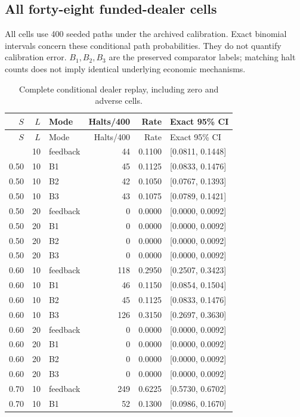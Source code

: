\subsection{All forty-eight funded-dealer cells}
All cells use 400 seeded paths under the archived calibration. Exact binomial intervals concern these conditional path probabilities. They do not quantify calibration error. $B_1,B_2,B_3$ are the preserved comparator labels; matching halt counts does not imply identical underlying economic mechanisms.
\begin{longtable}{rrlrrl}
\caption{Complete conditional dealer replay, including zero and adverse cells.}\\
\toprule $S$ & $L$ & Mode & Halts/400 & Rate & Exact 95\% CI\\\midrule\endfirsthead
\toprule $S$ & $L$ & Mode & Halts/400 & Rate & Exact 95\% CI\\\midrule\endhead
\bottomrule\endfoot
0.50 & 10 & feedback & 44 & 0.1100 & [0.0811, 0.1448]\\
0.50 & 10 & B1 & 45 & 0.1125 & [0.0833, 0.1476]\\
0.50 & 10 & B2 & 42 & 0.1050 & [0.0767, 0.1393]\\
0.50 & 10 & B3 & 43 & 0.1075 & [0.0789, 0.1421]\\
0.50 & 20 & feedback & 0 & 0.0000 & [0.0000, 0.0092]\\
0.50 & 20 & B1 & 0 & 0.0000 & [0.0000, 0.0092]\\
0.50 & 20 & B2 & 0 & 0.0000 & [0.0000, 0.0092]\\
0.50 & 20 & B3 & 0 & 0.0000 & [0.0000, 0.0092]\\
0.60 & 10 & feedback & 118 & 0.2950 & [0.2507, 0.3423]\\
0.60 & 10 & B1 & 46 & 0.1150 & [0.0854, 0.1504]\\
0.60 & 10 & B2 & 45 & 0.1125 & [0.0833, 0.1476]\\
0.60 & 10 & B3 & 126 & 0.3150 & [0.2697, 0.3630]\\
0.60 & 20 & feedback & 0 & 0.0000 & [0.0000, 0.0092]\\
0.60 & 20 & B1 & 0 & 0.0000 & [0.0000, 0.0092]\\
0.60 & 20 & B2 & 0 & 0.0000 & [0.0000, 0.0092]\\
0.60 & 20 & B3 & 0 & 0.0000 & [0.0000, 0.0092]\\
0.70 & 10 & feedback & 249 & 0.6225 & [0.5730, 0.6702]\\
0.70 & 10 & B1 & 52 & 0.1300 & [0.0986, 0.1670]\\

\end{longtable}
